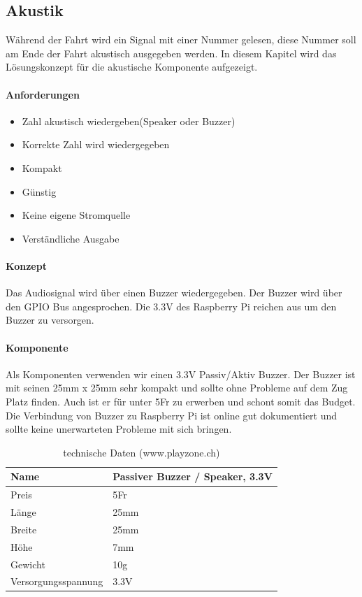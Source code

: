 \documentclass[../../main.tex]{subfiles}
\begin{document}
\subsection{Akustik}
Während der Fahrt wird ein Signal mit einer Nummer gelesen, diese Nummer soll am Ende der Fahrt akustisch ausgegeben werden. In diesem Kapitel wird das Lösungskonzept für die akustische Komponente aufgezeigt.

\paragraph{Anforderungen}
\begin{itemize}
    \item Zahl akustisch wiedergeben(Speaker oder Buzzer)
    \item Korrekte Zahl wird wiedergegeben
    \item Kompakt
    \item Günstig
    \item Keine eigene Stromquelle
    \item Verständliche Ausgabe
\end{itemize}

\paragraph{Konzept}
Das Audiosignal wird über einen Buzzer wiedergegeben. Der Buzzer wird über den GPIO Bus angesprochen. Die 3.3V des Raspberry Pi reichen aus um den Buzzer zu versorgen.

\paragraph{Komponente}
Als Komponenten verwenden wir einen 3.3V Passiv/Aktiv Buzzer. Der Buzzer ist mit seinen 25mm x 25mm sehr kompakt und sollte ohne Probleme auf dem Zug Platz finden. Auch ist er für unter 5Fr zu erwerben und schont somit das Budget. Die Verbindung von Buzzer zu Raspberry Pi ist online gut dokumentiert und sollte keine unerwarteten Probleme mit sich bringen.

\begin{table}[H]
\begin{center}
\begin{tabular}{ll}
Name & Passiver Buzzer / Speaker, 3.3V \\ \hline
Preis & 5Fr     \\ \hline
Länge & 25mm    \\ \hline
Breite & 25mm   \\ \hline
Höhe & 7mm      \\ \hline
Gewicht & 10g   \\ \hline
Versorgungsspannung & 3.3V \\ \hline
\end{tabular}
\caption{technische Daten (www.playzone.ch)}
\end{center}
\end{table}
\end{document}

